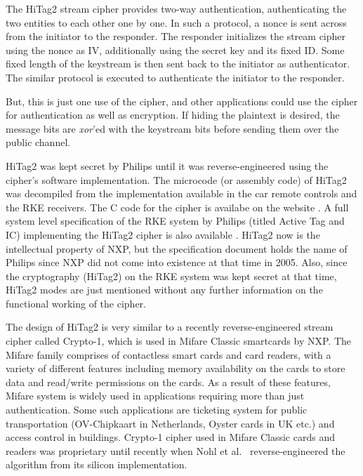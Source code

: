 The HiTag2 stream cipher provides two-way authentication, authenticating the two entities to each other one by one. In such a protocol, a nonce is sent across from the initiator to the responder. The responder initializes the stream cipher using the nonce as IV, additionally using the secret key and its fixed ID. Some fixed length of the keystream is then sent back to the initiator as authenticator. The similar protocol is executed to authenticate the initiator to the responder. 

But, this is just one use of the cipher, and other applications could use the cipher for authentication as well as encryption. If hiding the plaintext is desired, the message bits are \emph{xor}'ed with the keystream bits before sending them over the public channel. 

HiTag2 was kept secret by Philips until it was reverse-engineered using the cipher's software implementation. The microcode (or assembly code) of HiTag2 was decompiled from the implementation available in the car remote controls and the RKE receivers. The C code for the cipher is availabe on the website \cite{hitag2-code}. A full system level specification of the RKE system by Philips (titled Active Tag and IC) implementing the HiTag2 cipher is also available \cite{active-tag-datasheet}. HiTag2 now is the intellectual property of NXP, but the specification document holds the name of Philips since NXP did not come into existence at that time in 2005. Also, since the cryptography (HiTag2) on the RKE system was kept secret at that time, HiTag2 modes are just mentioned without any further information on the functional working of the cipher.

The design of HiTag2 is very similar to a recently reverse-engineered \cite{NohlESP-2008-usenix} stream cipher called Crypto-1, which is used in Mifare Classic smartcards by NXP. The Mifare family comprises of contactless smart cards and card readers, with a variety of different features including memory availability on the cards to store data and read/write permissions on the cards. As a result of these features, Mifare system is widely used in applications requiring more than just authentication. Some such applications are ticketing system for public transportation (OV-Chipkaart in Netherlands, Oyster cards in UK etc.) and access control in buildings. Crypto-1 cipher used in Mifare Classic cards and readers was proprietary until recently when Nohl et al.~\cite{NohlESP-2008-usenix} reverse-engineered the algorithm from its silicon implementation.

